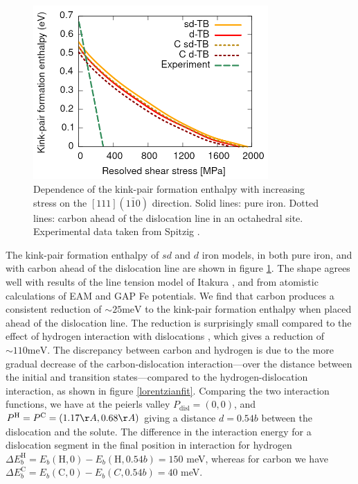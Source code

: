 \documentclass[a4paper,12pt,oneside,print,numbered,index,PageStyleIII]{PhDThesisPSnPDF}
\begin{document}
\begin{enumerate}
\begin{figure}[htbp]
\centering
\includegraphics[width=0.8\textwidth]{iron/Images/kink-pair_formation_enthalpies_dTB_sdTB_2000_big.png}
\caption{Dependence of the kink-pair formation enthalpy with increasing stress on the \([111](1\bar{1}0)\) direction. Solid lines: pure iron. Dotted lines: carbon ahead of the dislocation line in an octahedral site. Experimental data taken from Spitzig \cite{Spitzig_1970}. \label{kinkpairstress}}
\end{figure}



The kink-pair formation enthalpy of \(sd\) and \(d\) iron models, in both pure
iron, and with carbon ahead of the dislocation line are shown in figure
\ref{kinkpairstress}. The shape agrees well with results of the line tension
model of Itakura \cite{Itakura2012}, and from atomistic calculations of EAM
\cite{Proville2012} and GAP \cite{Maresca2018} Fe potentials. We find that
carbon produces a consistent reduction of \(\sim 25\text{meV}\) to the
kink-pair formation enthalpy when placed ahead of the dislocation line. The
reduction is surprisingly small compared to the effect of hydrogen
interaction with dislocations
\cite{itakura13_effec_hydrog_atoms_screw_disloc}, which gives a reduction of \(\sim 110 \text{meV}\). The discrepancy between carbon and hydrogen is due to
the more gradual decrease of the carbon-dislocation interaction---over the
distance between the initial and transition states---compared to the
hydrogen-dislocation interaction, as shown in figure
\ref{lorentzianfit}. Comparing the two interaction functions, we have at the
peierls valley \(P_{\text{disl}}=(0,0)\), and \(P^{\text{H}} = P^{\text{C}} =
     (1.17 \AA, 0.68 \AA)\) giving a distance \(d = 0.54b\) between the dislocation and
the solute. The difference in the interaction energy for a dislocation
segment in the final position in interaction for hydrogen \(\Delta
     E_b^{\text{H}} = E_b(\text{H},0) - E_b(\text{H},0.54b) = 150\) meV, whereas
for carbon we have \(\Delta E_b^{\text{C}} = E_b(\text{C},0) - E_b(C,0.54b) =
     40\) meV.



\end{enumerate}
\end{document}
